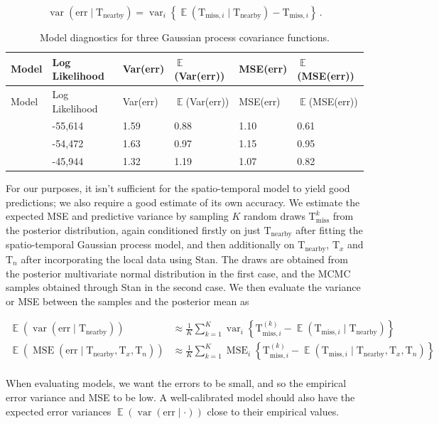 \documentclass[letter]{article}
\newcommand{\genericdel}[3]{%
      \left#1#3\right#2
    }
\newcommand{\del}[1]{\genericdel(){#1}}
\newcommand{\cbr}[1]{\genericdel\{\}{#1}}
\DeclareMathOperator{\E}{\mathbb{E}}
\DeclareMathOperator{\var}{{var}}
\DeclareMathOperator{\mse}{{MSE}}
\newcommand{\T}{\mathrm{T}}
\newcommand{\Tn}{\T_{n}}
\newcommand{\Tx}{\T_{x}}
\newcommand{\miss}{\mathrm{miss}}
\newcommand{\obs}{\mathrm{nearby}}
\newcommand{\error}{\mathrm{err}}
\DeclareMathOperator{\kSESE}{k_{\mathtt{SExSE}}}
\DeclareMathOperator{\kdiurn}{k_{\mathtt{SESE_{24}}}}
\DeclareMathOperator{\ksumprod}{k_{\mathtt{sumprod}}}
\newcommand{\eqlabel}[1]{\label{#1}}
\begin{document}
\begin{equation}
    \eqlabel{eq:varerr}
    \var\del{\error \mid \T_\obs} = \var_i \cbr{\E\del{\T_{\miss,i} \mid \T_\obs} - \T_{\miss,i}}\,.
\end{equation}
    


        \begin{longtable}[]{@{}llllll@{}}
\caption{Model diagnostics for three Gaussian process covariance functions. \label{table:diagnostics}}\tabularnewline
\toprule
Model & Log Likelihood & Var(err) & \(\E\)(Var(err)) & MSE(err) & \(\E\)(MSE(err))\tabularnewline
\midrule
\endfirsthead
\toprule
Model & Log Likelihood & Var(err) & \(\E\)(Var(err)) & MSE(err) & \(\E\)(MSE(err))\tabularnewline
\midrule
\endhead
\(\kSESE\) & -55,614 & 1.59 & 0.88 & 1.10 & 0.61\tabularnewline
\(\kdiurn\) & -54,472 & 1.63 & 0.97 & 1.15 & 0.95\tabularnewline
\(\ksumprod\) & -45,944 & 1.32 & 1.19 & 1.07 & 0.82\tabularnewline
\bottomrule
\end{longtable}
    


        For our purposes, it isn't sufficient for the spatio-temporal model to yield good predictions; we also require a good estimate of its own accuracy.
We estimate the expected MSE and predictive variance by sampling \(K\) random draws \(\T^k_\miss\) from the posterior distribution, again conditioned firstly on just \(\T_\obs\) after fitting the spatio-temporal Gaussian process model, and then additionally on \(\T_\obs\), \(\Tx\) and \(\Tn\) after incorporating the local data using Stan.
The draws are obtained from the posterior multivariate normal distribution in the first case, and the MCMC samples obtained through Stan in the second case.
We then evaluate the variance or MSE between the samples and the posterior mean as

\begin{equation}
\begin{split}
    \E \del{\var\del{\error \mid \T_\obs}} &\approx \frac{1}{K} \sum_{k=1}^K \var_i \cbr{\T^{(k)}_{\miss,i} - \E\del{\T_{\miss,i} \mid \T_\obs}} \\
    \E \del{\mse\del{\error \mid \T_\obs,\Tx,\Tn}} &\approx \frac{1}{K} \sum_{k=1}^K \mse_i \cbr{\T^{(k)}_{\miss,i} - \E\del{\T_{\miss,i} \mid \T_\obs,\Tx,\Tn}} \\
\end{split}
\end{equation}

When evaluating models, we want the errors to be small, and so the empirical error variance and MSE to be low. A well-calibrated model should also have the expected error variances \(\E \del{\var\del{\error \mid \cdot}}\) close to their empirical values.
\end{document}
